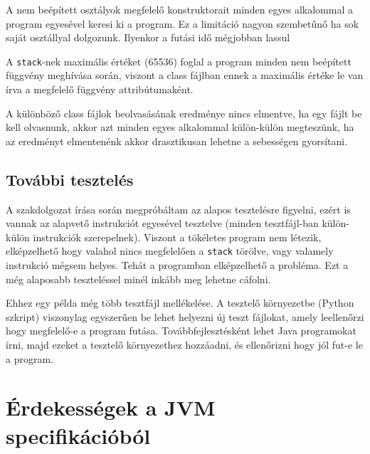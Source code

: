 \begin{compactitem}
	\item A nem beépített osztályok megfelelő konstruktorait minden egyes alkalommal a program egyesével keresi ki a program. Ez a limitáció nagyon szembetűnő ha sok saját osztállyal dolgozunk. Ilyenkor a futási idő mégjobban lassul
	\item A \lstinline{stack}-nek maximális értéket (65536) foglal a program minden nem beépített függvény meghívása során, viszont a class fájlban ennek a maximális értéke le van írva a megfelelő függvény attribútumaként.
	\item A különböző class fájlok beolvasásának eredménye nincs elmentve, ha egy fájlt be kell olvasnunk, akkor azt minden egyes alkalommal külön-külön megteszünk, ha az eredményt elmentenénk akkor drasztikusan lehetne a sebességen gyorsítani.
\end{compactitem}

\subsection{További tesztelés}

A szakdolgozat írása során megpróbáltam az alapos tesztelésre figyelni, ezért is vannak az alapvető instrukciót egyesével tesztelve (minden tesztfájl-ban külön-külön instrukciók szerepelnek). Viszont a tökéletes program nem létezik, elképzelhető hogy valahol nincs megfelelően a \lstinline{stack} törölve, vagy valamely instrukció mégsem helyes. Tehát a programban elképzelhető a probléma. Ezt a még alaposabb teszteléssel minél inkább meg lehetne cáfolni.

Ehhez egy példa még több tesztfájl mellékelése. A tesztelő környezetbe (Python szkript) viszonylag egyszerűen be lehet helyezni új teszt fájlokat, amely leellenőrzi hogy megfelelő-e a program futása. Továbbfejlesztésként lehet Java programokat írni, majd ezeket a tesztelő környezethez hozzáadni, és ellenőrizni hogy jól fut-e le a program.

\section{Érdekességek a JVM specifikációból}


		
